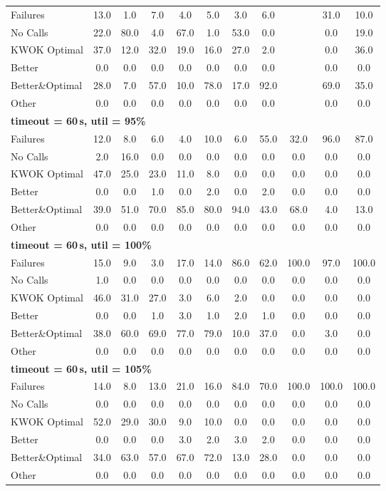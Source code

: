 \begin{tabular}{l cccccccccc}
\midrule
Failures & 13.0 & 1.0 & 7.0 & 4.0 & 5.0 & 3.0 & 6.0 & \text{--} & 31.0 & 10.0 \\
No Calls & 22.0 & 80.0 & 4.0 & 67.0 & 1.0 & 53.0 & 0.0 & \text{--} & 0.0 & 19.0 \\
KWOK Optimal & 37.0 & 12.0 & 32.0 & 19.0 & 16.0 & 27.0 & 2.0 & \text{--} & 0.0 & 36.0 \\
Better & 0.0 & 0.0 & 0.0 & 0.0 & 0.0 & 0.0 & 0.0 & \text{--} & 0.0 & 0.0 \\
Better\&Optimal & 28.0 & 7.0 & 57.0 & 10.0 & 78.0 & 17.0 & 92.0 & \text{--} & 69.0 & 35.0 \\
Other & 0.0 & 0.0 & 0.0 & 0.0 & 0.0 & 0.0 & 0.0 & \text{--} & 0.0 & 0.0 \\
\midrule
\multicolumn{11}{l}{\textbf{timeout = 60\,s, util = 95\%}} \\
\midrule
Failures & 12.0 & 8.0 & 6.0 & 4.0 & 10.0 & 6.0 & 55.0 & 32.0 & 96.0 & 87.0 \\
No Calls & 2.0 & 16.0 & 0.0 & 0.0 & 0.0 & 0.0 & 0.0 & 0.0 & 0.0 & 0.0 \\
KWOK Optimal & 47.0 & 25.0 & 23.0 & 11.0 & 8.0 & 0.0 & 0.0 & 0.0 & 0.0 & 0.0 \\
Better & 0.0 & 0.0 & 1.0 & 0.0 & 2.0 & 0.0 & 2.0 & 0.0 & 0.0 & 0.0 \\
Better\&Optimal & 39.0 & 51.0 & 70.0 & 85.0 & 80.0 & 94.0 & 43.0 & 68.0 & 4.0 & 13.0 \\
Other & 0.0 & 0.0 & 0.0 & 0.0 & 0.0 & 0.0 & 0.0 & 0.0 & 0.0 & 0.0 \\
\midrule
\multicolumn{11}{l}{\textbf{timeout = 60\,s, util = 100\%}} \\
\midrule
Failures & 15.0 & 9.0 & 3.0 & 17.0 & 14.0 & 86.0 & 62.0 & 100.0 & 97.0 & 100.0 \\
No Calls & 1.0 & 0.0 & 0.0 & 0.0 & 0.0 & 0.0 & 0.0 & 0.0 & 0.0 & 0.0 \\
KWOK Optimal & 46.0 & 31.0 & 27.0 & 3.0 & 6.0 & 2.0 & 0.0 & 0.0 & 0.0 & 0.0 \\
Better & 0.0 & 0.0 & 1.0 & 3.0 & 1.0 & 2.0 & 1.0 & 0.0 & 0.0 & 0.0 \\
Better\&Optimal & 38.0 & 60.0 & 69.0 & 77.0 & 79.0 & 10.0 & 37.0 & 0.0 & 3.0 & 0.0 \\
Other & 0.0 & 0.0 & 0.0 & 0.0 & 0.0 & 0.0 & 0.0 & 0.0 & 0.0 & 0.0 \\
\midrule
\multicolumn{11}{l}{\textbf{timeout = 60\,s, util = 105\%}} \\
\midrule
Failures & 14.0 & 8.0 & 13.0 & 21.0 & 16.0 & 84.0 & 70.0 & 100.0 & 100.0 & 100.0 \\
No Calls & 0.0 & 0.0 & 0.0 & 0.0 & 0.0 & 0.0 & 0.0 & 0.0 & 0.0 & 0.0 \\
KWOK Optimal & 52.0 & 29.0 & 30.0 & 9.0 & 10.0 & 0.0 & 0.0 & 0.0 & 0.0 & 0.0 \\
Better & 0.0 & 0.0 & 0.0 & 3.0 & 2.0 & 3.0 & 2.0 & 0.0 & 0.0 & 0.0 \\
Better\&Optimal & 34.0 & 63.0 & 57.0 & 67.0 & 72.0 & 13.0 & 28.0 & 0.0 & 0.0 & 0.0 \\
Other & 0.0 & 0.0 & 0.0 & 0.0 & 0.0 & 0.0 & 0.0 & 0.0 & 0.0 & 0.0 \\
\bottomrule
\end{tabular}
